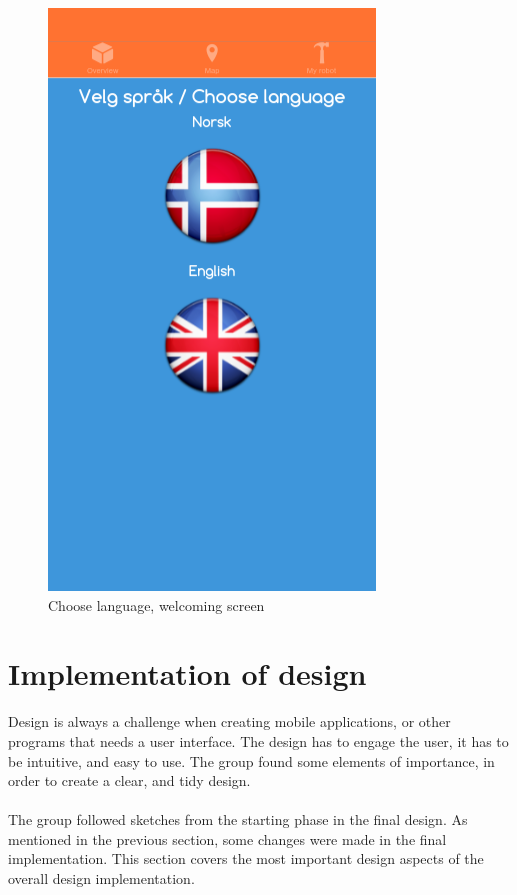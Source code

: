 \begin{figure}[H]
\begin{minipage}[b]{0.35\textwidth}
    \includegraphics[width=\textwidth]{images/app/chooseLanguage.png}
    \caption{Choose language, welcoming screen}
  \end{minipage}
\end{figure}

\section{Implementation of design}
Design is always a challenge when creating mobile applications, or other programs that needs a user interface. The design has to engage the user, it has to be intuitive, and easy to use. The group found some elements of importance, in order to create a clear, and tidy design.
\\\\
The group followed sketches from the starting phase in the final design. As mentioned in the previous section, some changes were made in the final implementation. This section covers the most important design aspects of the overall design implementation.

